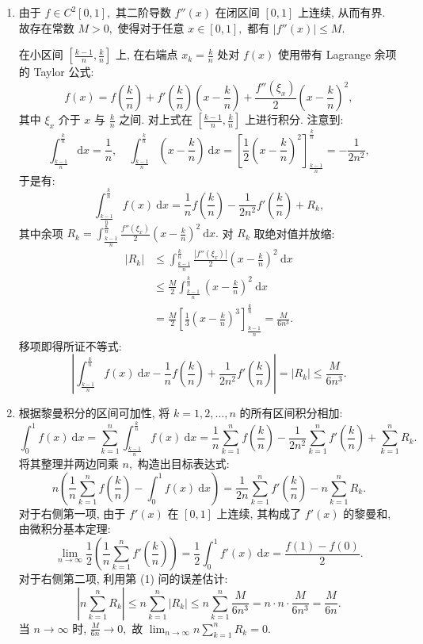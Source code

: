 \begin{solution}
\begin{enumerate}
\item 由于 $f \in C^2[0,1],$ 其二阶导数 $f''(x)$ 在闭区间 $[0,1]$ 上连续, 从而有界. 故存在常数 $M > 0,$ 使得对于任意 $x \in [0,1],$ 都有 $|f''(x)| \leqslant M.$

在小区间 $\left[\frac{k-1}{n}, \frac{k}{n}\right]$ 上, 在右端点 $x_k = \frac{k}{n}$ 处对 $f(x)$ 使用带有 Lagrange 余项的 Taylor 公式:
\[
f(x) = f\left(\frac{k}{n}\right) + f'\left(\frac{k}{n}\right)\left(x - \frac{k}{n}\right) + \frac{f''(\xi_x)}{2}\left(x - \frac{k}{n}\right)^2,
\]
其中 $\xi_x$ 介于 $x$ 与 $\frac{k}{n}$ 之间. 对上式在 $\left[\frac{k-1}{n}, \frac{k}{n}\right]$ 上进行积分. 注意到:
\[ \int_{\frac{k-1}{n}}^{\frac{k}{n}} \mathrm{d}x = \frac{1}{n}, \quad \int_{\frac{k-1}{n}}^{\frac{k}{n}} \left(x - \frac{k}{n}\right) ~ \mathrm{d}x = \left[ \frac{1}{2}\left(x - \frac{k}{n}\right)^2 \right]_{\frac{k-1}{n}}^{\frac{k}{n}} = -\frac{1}{2n^2}, \]
于是有:
\[
\int_{\frac{k-1}{n}}^{\frac{k}{n}} f(x) ~ \mathrm{d}x = \frac{1}{n} f\left(\frac{k}{n}\right) - \frac{1}{2n^2} f'\left(\frac{k}{n}\right) + R_k,
\]
其中余项 $R_k = \int_{\frac{k-1}{n}}^{\frac{k}{n}} \frac{f''(\xi_x)}{2}\left(x - \frac{k}{n}\right)^2 ~ \mathrm{d}x.$
对 $R_k$ 取绝对值并放缩:
\begin{align*}
|R_k| &\leqslant \int_{\frac{k-1}{n}}^{\frac{k}{n}} \frac{|f''(\xi_x)|}{2}\left(x - \frac{k}{n}\right)^2 ~ \mathrm{d}x \\
& \leqslant \frac{M}{2} \int_{\frac{k-1}{n}}^{\frac{k}{n}} \left(x - \frac{k}{n}\right)^2 ~ \mathrm{d}x \\
& = \frac{M}{2} \left[ \frac{1}{3}\left(x - \frac{k}{n}\right)^3 \right]_{\frac{k-1}{n}}^{\frac{k}{n}} = \frac{M}{6n^3}.
\end{align*}
移项即得所证不等式:
\[
\left| \int_{\frac{k-1}{n}}^{\frac{k}{n}} f(x) ~ \mathrm{d}x - \frac{1}{n} f\left(\frac{k}{n}\right) + \frac{1}{2n^2} f'\left(\frac{k}{n}\right) \right| = |R_k| \leqslant \frac{M}{6n^3}.
\]

\item 根据黎曼积分的区间可加性, 将 $k=1, 2, \dots, n$ 的所有区间积分相加:
\[
\int_0^1 f(x) ~ \mathrm{d}x = \sum_{k=1}^n \int_{\frac{k-1}{n}}^{\frac{k}{n}} f(x) ~ \mathrm{d}x = \frac{1}{n} \sum_{k=1}^n f\left(\frac{k}{n}\right) - \frac{1}{2n^2} \sum_{k=1}^n f'\left(\frac{k}{n}\right) + \sum_{k=1}^n R_k.
\]
将其整理并两边同乘 $n,$ 构造出目标表达式:
\[
n \left( \frac{1}{n} \sum_{k=1}^n f\left(\frac{k}{n}\right) - \int_0^1 f(x) ~ \mathrm{d}x \right) = \frac{1}{2n} \sum_{k=1}^n f'\left(\frac{k}{n}\right) - n \sum_{k=1}^n R_k.
\]
对于右侧第一项, 由于 $f'(x)$ 在 $[0,1]$ 上连续, 其构成了 $f'(x)$ 的黎曼和, 由微积分基本定理:
\[
\lim_{n\to\infty} \frac{1}{2} \left( \frac{1}{n} \sum_{k=1}^n f'\left(\frac{k}{n}\right) \right) = \frac{1}{2} \int_0^1 f'(x) ~ \mathrm{d}x = \frac{f(1) - f(0)}{2}.
\]
对于右侧第二项, 利用第 (1) 问的误差估计:
\[
\left| n \sum_{k=1}^n R_k \right| \leqslant n \sum_{k=1}^n |R_k| \leqslant n \sum_{k=1}^n \frac{M}{6n^3} = n \cdot n \cdot \frac{M}{6n^3} = \frac{M}{6n}.
\]
当 $n \to \infty$ 时, $\frac{M}{6n} \to 0,$ 故 $\lim_{n \to \infty} n \sum_{k=1}^n R_k = 0.$


\end{enumerate}
\end{solution}
